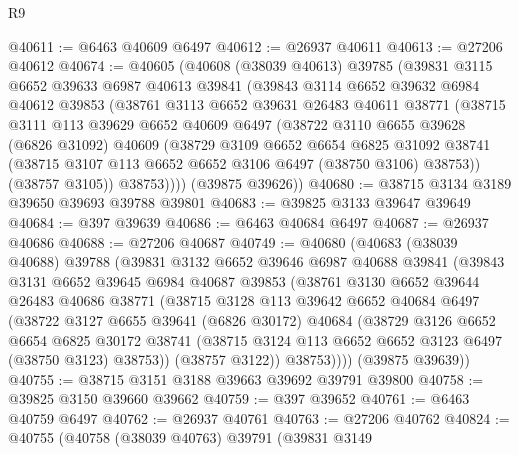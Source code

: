 \begin{lexlean}{R9}
\begin{coremodule}
@40611 := @6463 @40609 @6497
@40612 := @26937 @40611
@40613 := @27206 @40612
@40674 := @40605
    (@40608
      (@38039 @40613)
      @39785
      (@39831
        @3115
        @6652
        @39633
        @6987
        @40613
        @39841
        (@39843
          @3114
          @6652
          @39632
          @6984
          @40612
          @39853
          (@38761
            @3113
            @6652
            @39631
            @26483
            @40611
            @38771
            (@38715
              @3111
              @113
              @39629
              @6652
              @40609
              @6497
              (@38722
                @3110
                @6655
                @39628
                (@6826 @31092)
                @40609
                (@38729
                  @3109
                  @6652
                  @6654
                  @6825
                  @31092
                  @38741
                  (@38715 @3107 @113 @6652 @6652 @3106 @6497 (@38750 @3106) @38753))
                (@38757 @3105))
              @38753))))
      (@39875 @39626))
@40680 := @38715 @3134 @3189 @39650 @39693 @39788 @39801
@40683 := @39825 @3133 @39647 @39649
@40684 := @397 @39639
@40686 := @6463 @40684 @6497
@40687 := @26937 @40686
@40688 := @27206 @40687
@40749 := @40680
    (@40683
      (@38039 @40688)
      @39788
      (@39831
        @3132
        @6652
        @39646
        @6987
        @40688
        @39841
        (@39843
          @3131
          @6652
          @39645
          @6984
          @40687
          @39853
          (@38761
            @3130
            @6652
            @39644
            @26483
            @40686
            @38771
            (@38715
              @3128
              @113
              @39642
              @6652
              @40684
              @6497
              (@38722
                @3127
                @6655
                @39641
                (@6826 @30172)
                @40684
                (@38729
                  @3126
                  @6652
                  @6654
                  @6825
                  @30172
                  @38741
                  (@38715 @3124 @113 @6652 @6652 @3123 @6497 (@38750 @3123) @38753))
                (@38757 @3122))
              @38753))))
      (@39875 @39639))
@40755 := @38715 @3151 @3188 @39663 @39692 @39791 @39800
@40758 := @39825 @3150 @39660 @39662
@40759 := @397 @39652
@40761 := @6463 @40759 @6497
@40762 := @26937 @40761
@40763 := @27206 @40762
@40824 := @40755
    (@40758
      (@38039 @40763)
      @39791
      (@39831
        @3149

\end{coremodule}
\end{lexlean}
